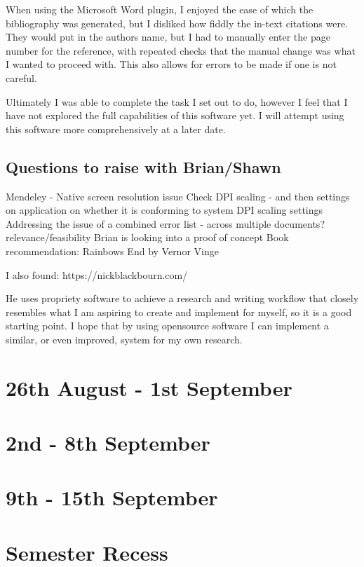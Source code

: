 \documentclass{article}
\begin{document}
When using the Microsoft Word plugin, I enjoyed the ease of which the bibliography was generated, but I disliked how fiddly the in-text citations were. They would put in the authors name, but I had to manually enter the page number for the reference, with repeated checks that the manual change was what I wanted to proceed with. This also allows for errors to be made if one is not careful. 

Ultimately I was able to complete the task I set out to do, however I feel that I have not explored the full capabilities of this software yet. 
I will attempt using this software more comprehensively at a later date.

\subsection{Questions to raise with Brian/Shawn}
\begin{outline}[enumerate]
    \1 Mendeley - Native screen resolution issue
        \2 Check DPI scaling - and then settings on application on whether it is conforming to system DPI scaling settings
    \1 Addressing the issue of a combined error list - across multiple documents? relevance/feasibility 
        \2 Brian is looking into a proof of concept
    \1 Book recommendation: Rainbows End by Vernor Vinge
\end{outline}

I also found: https://nickblackbourn.com/

He uses propriety software to achieve a research and writing workflow that closely resembles what I am aspiring to create and implement for myself, so it is a good starting point. I hope that by using opensource software I can implement a similar, or even improved, system for my own research.

\section{26th August - 1st September}

\section{2nd - 8th September}

\section{9th - 15th September}

\section*{Semester Recess}
\end{document}
